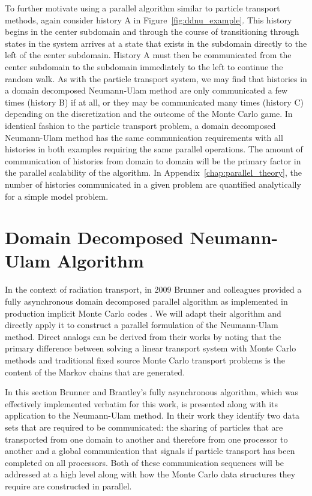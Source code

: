 To further motivate using a parallel algorithm similar to particle
transport methods, again consider history A in
Figure~\ref{fig:ddnu_example}. This history begins in the center
subdomain and through the course of transitioning through states in
the system arrives at a state that exists in the subdomain directly to
the left of the center subdomain. History A must then be communicated
from the center subdomain to the subdomain immediately to the left to
continue the random walk. As with the particle transport system, we
may find that histories in a domain decomposed Neumann-Ulam method are
only communicated a few times (history B) if at all, or they may be
communicated many times (history C) depending on the discretization
and the outcome of the Monte Carlo game. In identical fashion to the
particle transport problem, a domain decomposed Neumann-Ulam method
has the same communication requirements with all histories in both
examples requiring the same parallel operations. The amount of
communication of histories from domain to domain will be the primary
factor in the parallel scalability of the algorithm. In
Appendix~\ref{chap:parallel_theory}, the number of histories
communicated in a given problem are quantified analytically for a
simple model problem.

\clearpage

\section{Domain Decomposed Neumann-Ulam Algorithm\ }
\label{sec:asynchronous_algorithm}
In the context of radiation transport, in 2009 Brunner and colleagues
provided a fully asynchronous domain decomposed parallel algorithm as
implemented in production implicit Monte Carlo codes
\cite{brunner_efficient_2009}. We will adapt their algorithm and
directly apply it to construct a parallel formulation of the
Neumann-Ulam method. Direct analogs can be derived from their works by
noting that the primary difference between solving a linear transport
system with Monte Carlo methods and traditional fixed source Monte
Carlo transport problems is the content of the Markov chains that are
generated.

In this section Brunner and Brantley's fully asynchronous algorithm,
which was effectively implemented verbatim for this work, is presented
along with its application to the Neumann-Ulam method. In their work
they identify two data sets that are required to be communicated: the
sharing of particles that are transported from one domain to another
and therefore from one processor to another and a global communication
that signals if particle transport has been completed on all
processors. Both of these communication sequences will be addressed at
a high level along with how the Monte Carlo data structures they
require are constructed in parallel.


